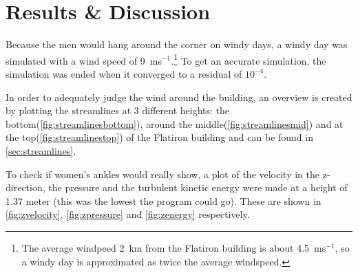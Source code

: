 \section{Results \& Discussion}
\label{sec:results}
Because the men would hang around the corner on windy days\cite{dresses}, a windy day was simulated with a wind speed of 9~ms$^{-1}$.\footnote{The average windpeed 2~km from the Flatiron building is about 4.5~ms$^{-1}$\cite{windspeed}, so a windy day is approximated as twice the average windspeed.} To get an accurate simulation, the simulation was ended when it converged to a residual of $10^{-4}$. 

In order to adequately judge the wind around the building, an overview is created by plotting the streamlines at 3 different heights: the bottom(\autoref{fig:streamlinesbottom}), around the middle(\autoref{fig:streamlinesmid}) and at the top(\autoref{fig:streamlinestop}) of the Flatiron building and can be found in \autoref{sec:streamlines}.

To check if women's ankles would really show, a plot of the velocity in the z-direction, the pressure and the turbulent kinetic energy were made at a height of 1.37 meter (this was the lowest the program could go). These are shown in \autoref{fig:zvelocity}, \ref{fig:zpressure} and \ref{fig:zenergy} respectively.

